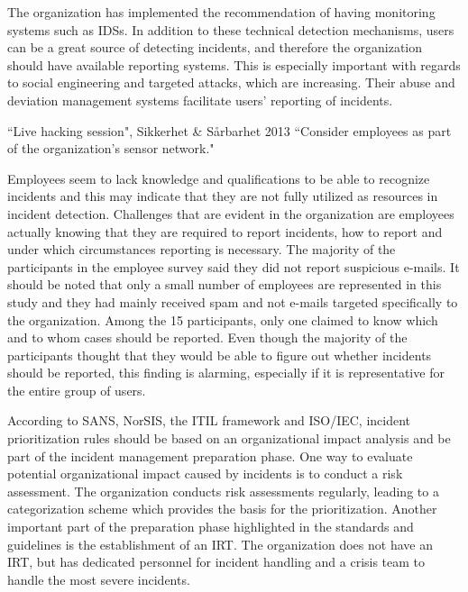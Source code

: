 The organization has implemented the recommendation of having monitoring systems such as IDSs. In addition to these technical detection mechanisms, users can be a great source of detecting incidents, and therefore the organization should have available reporting systems. This is especially important with regards to social engineering and targeted attacks, which are increasing. Their abuse and deviation management systems facilitate users' reporting of incidents. 

\begin{newquote}{``Live hacking session", Sikkerhet \& S\aa rbarhet 2013}
``Consider employees as part of the organization's sensor network."
\end{newquote}

Employees seem to lack knowledge and qualifications to be able to recognize incidents and this may indicate that they are not fully utilized as resources in incident detection. Challenges that are evident in the organization are employees actually knowing that they are required to report incidents, how to report and under which circumstances reporting is necessary. The majority of the participants in the employee survey said they did not report suspicious e-mails. It should be noted that only a small number of employees are represented in this study and they had mainly received spam and not e-mails targeted specifically to the organization. Among the 15 participants, only one claimed to know which and to whom cases should be reported. Even though the majority of the participants thought that they would be able to figure out whether incidents should be reported, this finding is alarming, especially if it is representative for the entire group of users. 

According to SANS, NorSIS, the ITIL framework and ISO/IEC, incident prioritization rules should be based on an organizational impact analysis and be part of the incident management preparation phase. One way to evaluate potential organizational impact caused by incidents is to conduct a risk assessment. The organization conducts risk assessments regularly, leading to a categorization scheme which provides the basis for the prioritization. Another important part of the preparation phase highlighted in the standards and guidelines is the establishment of an \ac{IRT}. The organization does not have an \ac{IRT}, but has dedicated personnel for incident handling and a crisis team to handle the most severe incidents.

